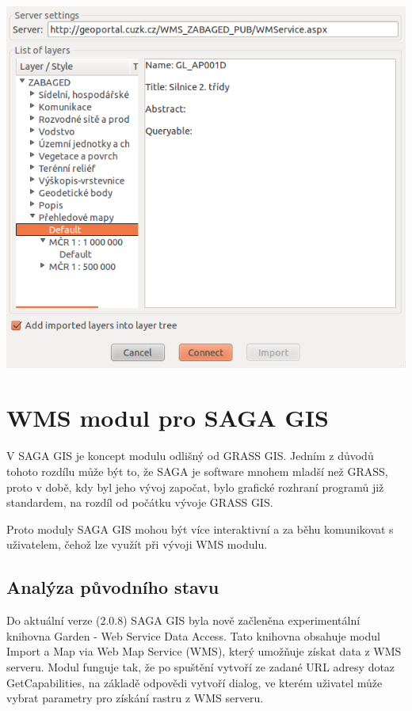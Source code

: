 \documentclass[a4paper,12pt]{article}
\begin{document}
\includegraphics[scale=0.5]{figures/GRASS_dialog_soucasny_stav.png}

\newpage

\section{ WMS modul pro SAGA GIS}

V SAGA GIS je koncept modulu odlišný od GRASS GIS. Jedním z důvodů tohoto rozdílu může být to, že SAGA je software mnohem mladší než GRASS, proto v době, kdy byl jeho vývoj započat, bylo grafické rozhraní programů již standardem, na rozdíl 
 od počátku vývoje GRASS GIS. 

Proto moduly SAGA GIS mohou být více interaktivní a za běhu komunikovat s uživatelem, čehož lze využít při vývoji WMS modulu.

\subsection{Analýza původního stavu}

Do aktuální verze (2.0.8) SAGA GIS byla nově začleněna experimentální knihovna Garden - Web Service Data Access. Tato knihovna obsahuje modul Import a Map via Web Map Service (WMS), který umožňuje získat data z WMS serveru.
Modul funguje tak, že po spuštění vytvoří ze zadané URL adresy dotaz GetCapabilities, na základě odpovědi vytvoří dialog, ve kterém uživatel může vybrat parametry pro získání rastru z WMS serveru. 
\end{document}
